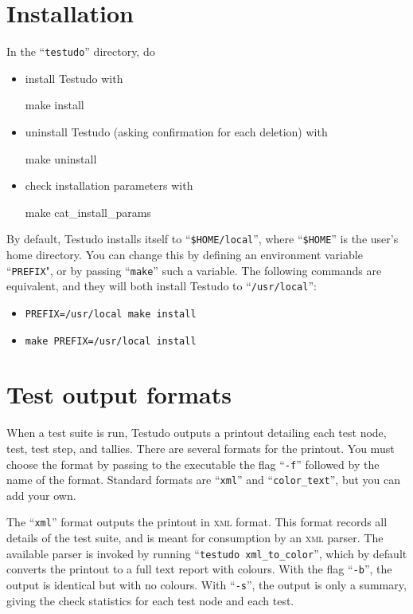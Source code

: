 \documentclass[twoside, a4paper, article]{memoir}
\begin{document}
\mainmatter


\chapter{Installation}

In the ``\texttt{testudo}'' directory, do
\begin{itemize}
\item install Testudo with
\begin{bashlisting}
make install
\end{bashlisting}
\item uninstall Testudo (asking confirmation for each deletion) with
\begin{bashlisting}
make uninstall
\end{bashlisting}
\item check installation parameters with
\begin{bashlisting}
make cat_install_params
\end{bashlisting}
\end{itemize}

By default, Testudo installs itself to ``\texttt{\$HOME/local}'', where
``\texttt{\$HOME}'' is the user's home directory.  You can change this by
defining an environment variable ``\texttt{PREFIX}", or by passing
``\texttt{make}'' such a variable.  The following commands are equivalent, and
they will both install Testudo to ``\texttt{/usr/local}'':
\begin{itemize}
\item \texttt{PREFIX=/usr/local make install}
\item \texttt{make PREFIX=/usr/local install}
\end{itemize}


\chapter{Test output formats}
\label{cha:test-output-formats}

When a test suite is run, Testudo outputs a printout detailing each test node,
test, test step, and tallies.  There are several formats for the printout.  You
must choose the format by passing to the executable the flag ``\texttt{-f}''
followed by the name of the format.  Standard formats are ``\texttt{xml}'' and
``\texttt{color\_text}'', but you can add your own.

The ``\texttt{xml}'' format outputs the printout in \textsc{xml} format.  This
format records all details of the test suite, and is meant for consumption by
an \textsc{xml} parser.  The available parser is invoked by running
``\texttt{testudo xml\_to\_color}'', which by default converts the printout to
a full text report with colours.  With the flag ``\texttt{-b}'', the output is
identical but with no colours.  With ``\texttt{-s}'', the output is only a
summary, giving the check statistics for each test node and each test.
\end{document}
